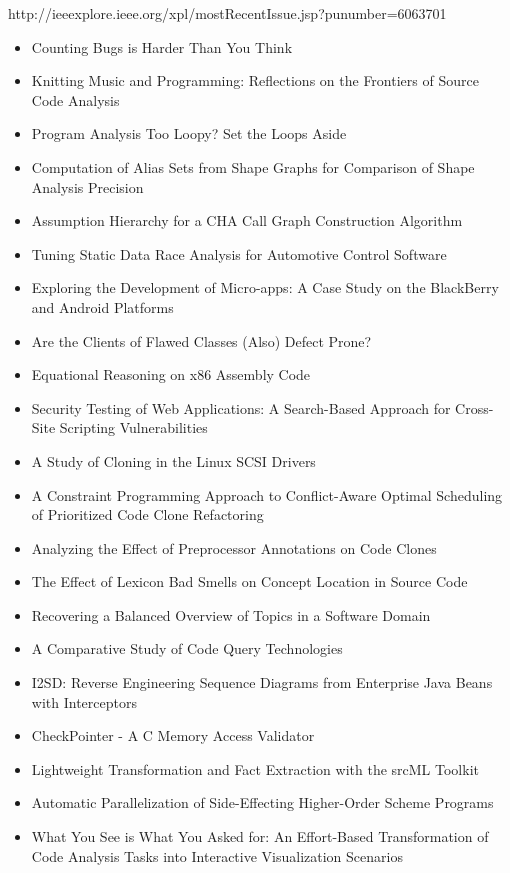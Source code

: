 http://ieeexplore.ieee.org/xpl/mostRecentIssue.jsp?punumber=6063701

{\small
\begin{itemize}[itemsep=-1ex]
  \item Counting Bugs is Harder Than You Think
  \item Knitting Music and Programming: Reflections on the Frontiers of Source Code Analysis
  \item Program Analysis Too Loopy? Set the Loops Aside
  \item Computation of Alias Sets from Shape Graphs for Comparison of Shape Analysis Precision
  \item Assumption Hierarchy for a CHA Call Graph Construction Algorithm
  \item Tuning Static Data Race Analysis for Automotive Control Software
  \item Exploring the Development of Micro-apps: A Case Study on the BlackBerry and Android Platforms
  \item Are the Clients of Flawed Classes (Also) Defect Prone?
  \item Equational Reasoning on x86 Assembly Code
  \item Security Testing of Web Applications: A Search-Based Approach for Cross-Site Scripting Vulnerabilities
  \item A Study of Cloning in the Linux SCSI Drivers
  \item A Constraint Programming Approach to Conflict-Aware Optimal Scheduling of Prioritized Code Clone Refactoring
  \item Analyzing the Effect of Preprocessor Annotations on Code Clones
  \item The Effect of Lexicon Bad Smells on Concept Location in Source Code
  \item Recovering a Balanced Overview of Topics in a Software Domain
  \item A Comparative Study of Code Query Technologies
  \item I2SD: Reverse Engineering Sequence Diagrams from Enterprise Java Beans with Interceptors
  \item CheckPointer - A C Memory Access Validator
  \item Lightweight Transformation and Fact Extraction with the srcML Toolkit
  \item Automatic Parallelization of Side-Effecting Higher-Order Scheme Programs
  \item What You See is What You Asked for: An Effort-Based Transformation of Code Analysis Tasks into Interactive Visualization Scenarios
\end{itemize}
}

